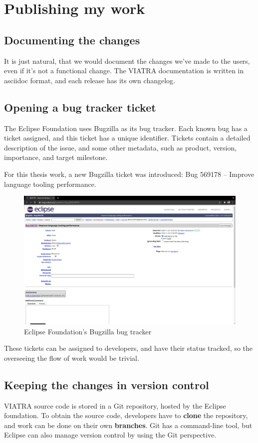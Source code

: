 \documentclass[11pt,a4paper,oneside]{report}
\begin{document}
\chapter{Publishing my work}
\section{Documenting the changes}
It is just natural, that we would document the changes we've made to the users,
even if it's not a functional change. The VIATRA documentation is written in
asciidoc format, and each release has its own changelog.

\section{Opening a bug tracker ticket}
The Eclipse Foundation uses Bugzilla as its bug tracker. Each known bug has a
ticket assigned, and this ticket has a unique identifier. Tickets contain
a detailed description of the issue, and some other metadata, such as product,
version, importance, and target milestone.

For this thesis work, a new Bugzilla ticket was introduced:
Bug 569178 -- Improve language tooling performance.

\begin{figure}[ht]
\centering
\includegraphics[width=150mm, keepaspectratio]{figures/bugzilla.png}
\caption{Eclipse Foundation's Bugzilla bug tracker}
\label{fig:bugzilla}
\end{figure}

These tickets can be assigned to developers, and have their status tracked, so
the overseeing the flow of work would be trivial.

\section{Keeping the changes in version control}
VIATRA source code is stored in a Git repository, hosted by the Eclipse
foundation. To obtain the source code, developers have to \textbf{clone} the
repository, and work can be done on their own \textbf{branches}. Git has a
command-line tool, but Eclipse can also manage version control by using the
Git perspective.
\end{document}
